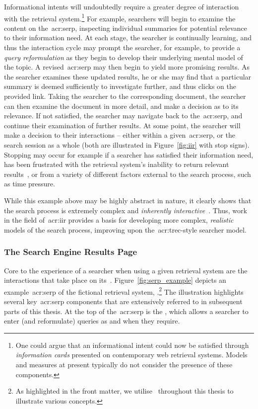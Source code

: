 Informational intents will undoubtedly require a greater degree of interaction with the retrieval system.\footnote{One could argue that an informational intent could now be satisfied through \emph{information cards} presented on contemporary web retrieval systems. Models and measures at present typically do not consider the presence of these components.} For example, searchers will begin to examine the content on the~\gls{acr:serp}, inspecting individual summaries for potential relevance to their information need. At each stage, the searcher is continually learning, and thus the interaction cycle may prompt the searcher, for example, to provide a \emph{query reformulation} as they begin to develop their underlying mental model of the topic. A revised~\gls{acr:serp} may then begin to yield more promising results. As the searcher examines these updated results, he or she may find that a particular summary is deemed sufficiently  to investigate further, and thus clicks on the provided link. Taking the searcher to the corresponding document, the searcher can then examine the document in more detail, and make a decision as to its relevance. If not satisfied, the searcher may navigate back to the~\gls{acr:serp}, and continue their examination of further results. At some point, the searcher will make a decision to  their interactions -- either within a given~\gls{acr:serp}, or the search session as a whole (both are illustrated in Figure~\ref{fig:iir} with stop signs). Stopping may occur for example if a searcher has satisfied their information need, has been frustrated with the retrieval system's inability to return relevant results~\citep{cooper1973retrieval_effectiveness_ii}, or from a variety of different factors external to the search process, such as time pressure.

While this example above may be highly abstract in nature, it clearly shows that the search process is extremely complex and \emph{inherently interactive}~\citep{ingwersen2005theturn}. Thus, work in the field of~\gls{acr:iir} provides a basis for developing more complex, \emph{realistic} models of the search process, improving upon the~\gls{acr:trec}-style searcher model.

\subsubsection{The Search Engine Results Page}\label{sec:ir_background:user:iir:serp}
Core to the experience of a searcher when using a given retrieval system are the interactions that take place on its~. Figure~\ref{fig:serp_example} depicts an example~\gls{acr:serp} of the fictional retrieval system, \searchlogo.\footnote{As highlighted in the front matter, we utilise \searchlogo~throughout this thesis to illustrate various concepts.} The illustration highlights several key~\gls{acr:serp} components that are extensively referred to in subsequent parts of this thesis. At the top of the~\gls{acr:serp} is the , which allows a searcher to enter (and reformulate) queries as and when they require.

